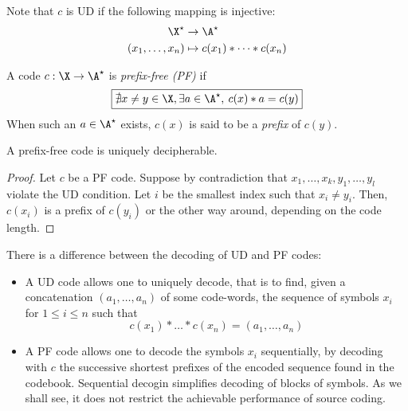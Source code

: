 \documentclass[toc, titlepaged]{../cs-classes/cs-classes}
\begin{document}
\begin{remark}
    Note that $c$ is UD if the following mapping is injective:
    \begin{equation*}
        \begin{aligned}
            \X^\star&\to\A^\star\\
            (x_1, \dots, x_n)&\mapsto c(x_1) * \dots * c(x_n)
        \end{aligned}
    \end{equation*}
\end{remark}

\begin{definition}
    A code $c: \X\to\A^\star$ is \emph{prefix-free (PF)} if
    \begin{equation}
        \boxed{\nexists x\neq y\in \X, \exists a\in\A^\star,\: c(x)*a=c(y)}
    \end{equation} 
    When such an $a\in\A^\star$ exists, $c(x)$ is said to be a \emph{prefix} of $c(y)$.
\end{definition}

\begin{lemma}[PF$\implies$ UD]
    A prefix-free code is uniquely decipherable.
\end{lemma}

\begin{proof}
    Let $c$ be a PF code. Suppose by contradiction that $x_1, \dots, x_k, y_1, \dots, y_l$ violate the UD condition. Let $i$ be the smallest index such that $x_i\neq y_i$. Then, $c(x_i)$ is a prefix of $c(y_i)$ or the other way around, depending on the code length.
\end{proof}

\begin{remark}
    There is a difference between the decoding of UD and PF codes:
    \begin{itemize}
        \item A UD code allows one to uniquely decode, that is to find, given a concatenation $(a_1, \dots, a_n)$ of some code-words, the sequence of symbols $x_i$ for $1\leq i\leq n$ such that
        \begin{equation*}
            c(x_1)*\dots *c(x_n)=(a_1, \dots, a_n)
        \end{equation*} 
        \item A PF code allows one to decode the symbols $x_i$ sequentially, by decoding with $c$ the successive shortest prefixes of the encoded sequence found in the codebook. Sequential decogin simplifies decoding of blocks of symbols. As we shall see, it does not restrict the achievable performance of source coding.
    \end{itemize}
\end{remark}
\end{document}
